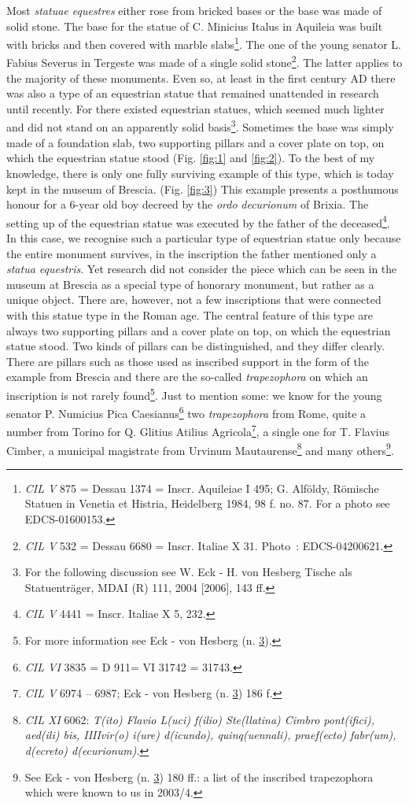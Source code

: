 \documentclass[amsthm,ebook]{saparticle}
\begin{document}
Most \textit{statuae equestres }either rose from bricked bases or the base was 
made of solid stone. The base for the statue of C. Minicius Italus in Aquileia 
was built with bricks and then covered with marble slabs\footnote{\emph{CIL V} 875 = Dessau 1374 = Inscr. Aquileiae I 495; G. Alföldy, Römische Statuen in Venetia et Histria, Heidelberg 1984, 98 f. no. 87. For a photo see EDCS-01600153.}. The one of the young 
senator L. Fabius Severus in Tergeste was made of a single solid stone\footnote{\emph{CIL V} 532 = Dessau 6680 = Inscr. Italiae X 31. Photo : EDCS-04200621.}. The latter 
applies to the majority of these monuments. Even so, at least in the first century 
AD there was also a type of an equestrian statue that remained unattended in research 
until recently. For there existed equestrian statues, which seemed much lighter 
and did not stand on an apparently solid basis\footnote{\label{fn:30}For the following discussion see W. Eck - H. von Hesberg Tische als Statuenträger, MDAI (R) 111, 2004 [2006], 143 ff.}. Sometimes the base was simply made 
of a foundation slab, two supporting pillars and a cover plate on top, on which 
the equestrian statue stood (Fig. \ref{fig:1} and \ref{fig:2}). To the best of my knowledge, there 
is only one fully surviving example of this type, which is today kept in the museum 
of Brescia. (Fig. \ref{fig:3}) This example presents a posthumous honour for a 6-year old 
boy decreed by the \textit{ordo} \textit{decurionum }of Brixia. The setting up 
of the equestrian statue was executed by the father of the deceased\footnote{\emph{CIL V} 4441 = Inscr. Italiae X 5, 232.}. In this case, 
we recognise such a particular type of equestrian statue only because the entire 
monument survives, in the inscription the father mentioned only a \textit{statua 
equestris}. Yet research did not consider the piece which can be seen in the museum 
at Brescia as a special type of honorary monument, but rather as a unique object. 
There are, however, not a few inscriptions that were connected with this statue 
type in the Roman age. The central feature of this type are always two supporting 
pillars and a cover plate on top, on which the equestrian statue stood. Two kinds 
of pillars can be distinguished, and they differ clearly. There are pillars such 
as those used as inscribed support in the form of the example from Brescia and 
there are the so-called \textit{trapezophora }on which an inscription is not rarely 
found\footnote{For more information see Eck - von Hesberg (n. \ref{fn:30}).}. Just to mention some: we know for the young senator P. Numicius Pica Caesianus\footnote{\emph{CIL VI} 3835 = D 911= VI 31742 = 31743.} 
two \textit{trapezophora }from Rome, quite a number from Torino for Q. Glitius 
Atilius Agricola\footnote{\emph{CIL V} 6974 – 6987; Eck - von Hesberg (n. \ref{fn:30}) 186 f.}, a single one for T. Flavius Cimber, a municipal magistrate from 
Urvinum Mautaurense\footnote{\emph{CIL XI} 6062: \emph{T(ito) Flavio L(uci) f(ilio) Ste(llatina) Cimbro pont(ifici), aed(ili) bis, IIIIvir(o) i(ure) d(icundo), quinq(uennali), praef(ecto) fabr(um), d(ecreto) d(ecurionum)}.} and many others\footnote{See Eck - von Hesberg (n. \ref{fn:30}) 180 ff.: a list of the inscribed trapezophora which were known to us in 2003/4.}.
\end{document}
